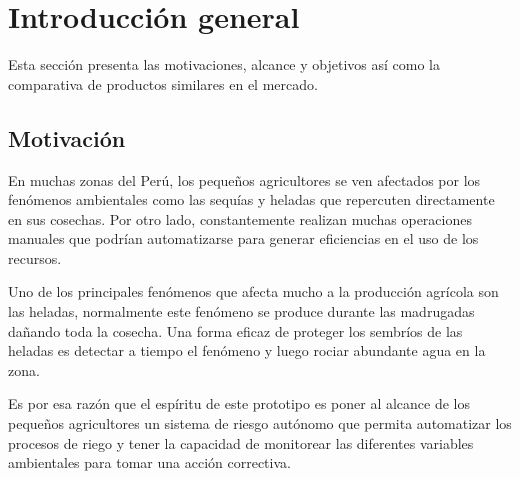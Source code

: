 
\chapter{Introducción general} %

\label{Chapter1} %
\label{IntroGeneral}


\newcommand{\keyword}[1]{\textbf{#1}}
\newcommand{\tabhead}[1]{\textbf{#1}}
\newcommand{\code}[1]{\texttt{#1}}
\newcommand{\file}[1]{\texttt{\bfseries#1}}
\newcommand{\option}[1]{\texttt{\itshape#1}}
\newcommand{\grados}{$^{\circ}$}


Esta sección presenta las motivaciones, alcance y objetivos así como la comparativa de productos similares en el mercado.

\section{Motivación}

En muchas zonas del Perú, los pequeños agricultores se ven afectados por los fenómenos ambientales como las sequías y heladas que repercuten directamente en sus cosechas. Por otro lado, constantemente realizan muchas operaciones manuales que podrían automatizarse para generar eficiencias en el uso de los recursos.

Uno de los principales fenómenos que afecta mucho a la producción agrícola son las heladas, normalmente este fenómeno se produce durante las madrugadas dañando toda la cosecha. Una forma eficaz de proteger los sembríos de las heladas es detectar a tiempo el fenómeno y luego rociar abundante agua en la zona.

Es por esa razón que el espíritu de este prototipo es poner al alcance de los pequeños agricultores un sistema de riesgo autónomo que permita automatizar los procesos de riego y tener la capacidad de monitorear las diferentes variables ambientales para tomar una acción correctiva.



